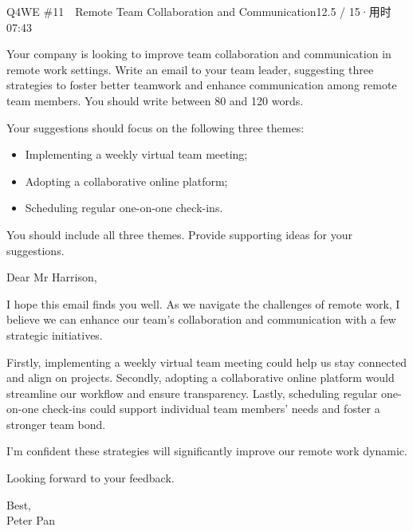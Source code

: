 \begin{qblock}{Q4\quad WE \#11\ \ Remote Team Collaboration and Communication}{12.5 / 15\quad·\quad 用时 07:43}

\begin{promptbox}
Your company is looking to improve team collaboration and communication in remote work settings. Write an email to your team leader, suggesting three strategies to foster better teamwork and enhance communication among remote team members. You should write between 80 and 120 words.

\smallskip Your suggestions should focus on the following three themes:
\begin{itemize}[leftmargin=1.4em,topsep=2pt,itemsep=0pt]
  \item Implementing a weekly virtual team meeting;
  \item Adopting a collaborative online platform;
  \item Scheduling regular one-on-one check-ins.
\end{itemize}
You should include all three themes. Provide supporting ideas for your suggestions.
\end{promptbox}

\begin{modelbox}
Dear Mr Harrison,

I hope this email finds you well. As we navigate the challenges of remote work, I believe we can enhance our team's collaboration and communication with a few strategic initiatives.

Firstly, implementing a weekly virtual team meeting could help us stay connected and align on projects. Secondly, adopting a collaborative online platform would streamline our workflow and ensure transparency. Lastly, scheduling regular one-on-one check-ins could support individual team members' needs and foster a stronger team bond.

I'm confident these strategies will significantly improve our remote work dynamic.

Looking forward to your feedback.

Best,\\ Peter Pan
\end{modelbox}


\end{qblock}
